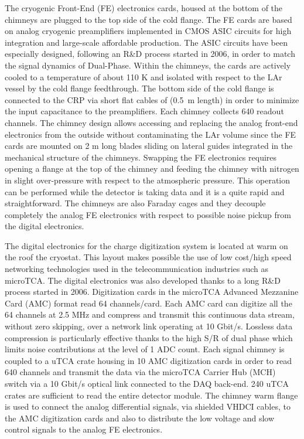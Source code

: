 The cryogenic Front-End (FE) electronics cards, housed at the bottom of the chimneys are plugged to the top side of  the cold flange. The FE cards are based on analog cryogenic preamplifiers implemented in CMOS ASIC circuits for high integration and large-scale affordable production. The ASIC circuits have been especially designed, following an R\&D process started in 2006, in order to match the signal dynamics of Dual-Phase. Within the chimneys, the cards are actively cooled to a temperature of about 110 K and isolated with respect to the LAr vessel by the cold flange feedthrough.  The bottom side of the cold flange is connected to the CRP via short flat cables of (0.5~m length) in order to minimize the input capacitance to the preamplifiers. Each chimney collects 640 readout channels. The chimney design allows accessing and replacing the analog front-end electronics from the outside without contaminating the LAr volume since the FE cards are mounted on 2 m long blades sliding on lateral guides integrated in the mechanical structure of the chimneys. Swapping the FE electronics requires opening a flange at the top of the chimney and feeding the chimney with nitrogen in slight over-pressure with respect to the atmospheric pressure.  This operation can be performed while the detector is taking data and it is a quite rapid and straightforward. The chimneys are also Faraday cages and they decouple completely the analog FE electronics with respect to possible noise pickup from the digital electronics.   

The digital electronics for the  charge digitization system is located at warm on the roof the cryostat. This layout makes possible the use of low cost/high speed  networking technologies used in the telecommunication industries such as microTCA. The digital electronics was also developed thanks to a long R\&D process started in 2006.  Digitization cards in the microTCA  Advanced Mezzanine Card (AMC) format read 64 channels/card. Each AMC card can digitize all the 64 channels at 2.5 MHz and compress and transmit this continuous data stream, without zero skipping, over a network link operating at 10 Gbit/s. Lossless data compression is particularly effective thanks to the high S/R of dual phase which limits noise contributions at the level of 1 ADC count. Each signal chimney is coupled to a uTCA crate housing in 10 AMC digitization cards in order to read 640 channels and transmit the data via the  microTCA Carrier Hub (MCH) switch via a 10 Gbit/s optical link connected to the DAQ back-end. 240 uTCA crates are sufficient to read the entire detector module. The chimney warm flange is used to connect the analog differential signals, via shielded VHDCI cables, to the AMC digitization cards and also to distribute the low voltage and slow control signals to the analog FE electronics.  

